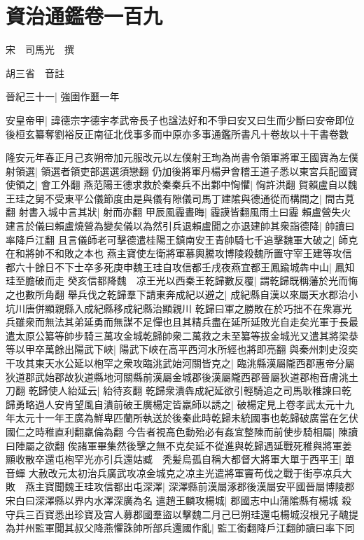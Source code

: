 \section{資治通鑑卷一百九}
宋　司馬光　撰

胡三省　音註

晉紀三十一|{
	強圉作噩一年}


安皇帝甲|{
	諱德宗字德宇孝武帝長子也諡法好和不爭曰安又曰生而少斷曰安帝即位後桓玄纂奪劉裕反正南征北伐事多而中原亦多事通鑑所書凡十卷故以十干書卷數}


隆安元年春正月己亥朔帝加元服改元以左僕射王珣為尚書令領軍將軍王國寶為左僕射領選|{
	領選者領吏部選選須戀翻}
仍加後將軍丹楊尹會稽王道子悉以東宮兵配國寶使領之|{
	會工外翻}
燕范陽王德求救於秦秦兵不出鄴中恟懼|{
	恟許洪翻}
賀賴盧自以魏王珪之舅不受東平公儀節度由是與儀有隙儀司馬丁建隂與德通從而構間之|{
	間古莧翻}
射書入城中言其狀|{
	射而亦翻}
甲辰風霾晝晦|{
	霾謨皆翻風雨土曰霾}
賴盧營失火建言於儀曰賴盧燒營為變矣儀以為然引兵退賴盧聞之亦退建帥其衆詣德降|{
	帥讀曰率降戶江翻}
且言儀師老可擊德遣桂陽王鎮南安王青帥騎七千追擊魏軍大破之|{
	師克在和將帥不和敗之本也}
燕主寶使左衛將軍慕輿騰攻博陵殺魏所置守宰王建等攻信都六十餘日不下士卒多死庚申魏王珪自攻信都壬戌夜燕宜都王鳳踰城犇中山|{
	鳳知珪至膽破而走}
癸亥信都降魏　凉王光以西秦王乾歸數反覆|{
	謂乾歸既稱藩於光而悔之也數所角翻}
舉兵伐之乾歸羣下請東奔成紀以避之|{
	成紀縣自漢以來屬天水郡治小坑川唐併顯親縣入成紀縣移成紀縣治顯親川}
乾歸曰軍之勝敗在於巧拙不在衆寡光兵雖衆而無法其弟延勇而無謀不足憚也且其精兵盡在延所延敗光自走矣光軍于長最遣太原公纂等帥步騎三萬攻金城乾歸帥衆二萬救之未至纂等拔金城光又遣其將梁㳟等以甲卒萬餘出陽武下峽|{
	陽武下峽在高平西河水所經也將即亮翻}
與秦州刺史沒奕干攻其東天水公延以枹罕之衆攻臨洮武始河關皆克之|{
	臨洮縣漢屬隴西郡惠帝分屬狄道郡武始郡故狄道縣地河關縣前漢屬金城郡後漢屬隴西郡晉屬狄道郡枹音膚洮土刀翻}
乾歸使人紿延云|{
	紿待亥翻}
乾歸衆潰犇成紀延欲引輕騎追之司馬耿稚諫曰乾歸勇略過人安肯望風自潰前破王廣楊定皆羸師以誘之|{
	破楊定見上卷孝武太元十九年太元十一年王廣為鮮卑匹蘭所執送於後秦此時乾歸未統國事也乾歸破廣當在乞伏國仁之時稚直利翻羸倫為翻}
今告者視高色動殆必有姦宜整陳而前使步騎相屬|{
	陳讀曰陣屬之欲翻}
俟諸軍畢集然後擊之無不克矣延不從進與乾歸遇延戰死稚與將軍姜顯收散卒還屯枹罕光亦引兵還姑臧　秃髪烏孤自稱大都督大將軍大單于西平王|{
	單音蟬}
大赦改元太初治兵廣武攻凉金城克之凉主光遣將軍竇苟伐之戰于街亭凉兵大敗　燕主寶聞魏王珪攻信都出屯深澤|{
	深澤縣前漢屬涿郡後漢屬安平國晉屬博陵郡宋白曰深澤縣以界内水澤深廣為名}
遣趙王麟攻楊城|{
	郡國志中山蒲隂縣有楊城}
殺守兵三百寶悉出珍寶及宫人募郡國羣盜以擊魏二月己巳朔珪還屯楊城沒根兄子醜提為并州監軍聞其叔父降燕懼誅帥所部兵還國作亂|{
	監工銜翻降戶江翻帥讀曰率下同}
